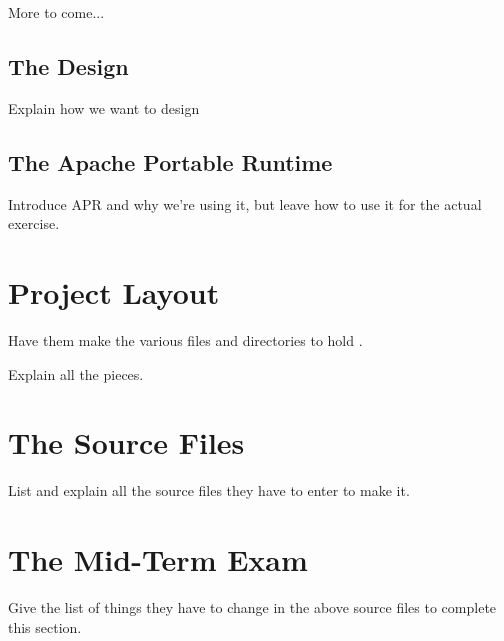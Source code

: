 More to come...

\subsection{The Design}

Explain how we want to design 


\subsection{The Apache Portable Runtime}

Introduce APR and why we're using it, but leave how to use it for the actual exercise.

\section{Project Layout}

Have them make the various files and directories to hold .

Explain all the pieces.

\section{The Source Files}

List and explain all the source files they have to enter to make it.


\section{The Mid-Term Exam}

Give the list of things they have to change in the above source files
to complete this section.

